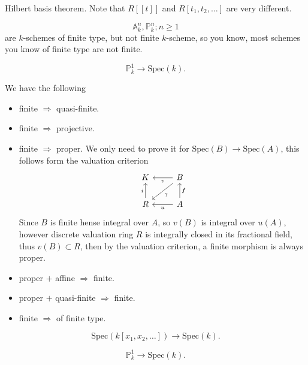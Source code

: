 \documentclass[../main.tex]{subfiles}
\begin{document}
\begin{remark}
Hilbert basis theorem. Note that $R[[t]]$ and $R[t_{1},t_{2},\dots]$ are very different.
\end{remark}
\begin{example}
$$\mathbb{A}_{k}^{n}, \mathbb{P}_{k}^{n}; n\geq 1$$
are $k$-schemes of finite type, but not finite $k$-scheme, so you know, most schemes you know of finite type are not finite.
\end{example}
\begin{remark}
\end{remark}
\begin{example}
$$\mathbb{P}_{k}^{1}\rightarrow \mathrm{Spec}(k).$$
\end{example}
\begin{remark}
We have the following 
\begin{itemize}
\item finite $\Rightarrow$ quasi-finite.
\item finite $\Rightarrow$ projective.
\item finite $\Rightarrow$ proper. We only need to prove it for $\mathrm{Spec}(B)\rightarrow \mathrm{Spec}(A)$, this follows form the valuation criterion
$$\begin{tikzcd}K& B\arrow{l}{v}\arrow{dl}{?}\\
R\arrow{u}{i} & A\arrow{l}{u}\arrow{u}[swap]{f}\end{tikzcd}$$
Since $B$ is finite hense integral over $A$, so $v(B)$ is integral over $u(A)$, however discrete valuation ring $R$ is integrally closed in its fractional field, thus $v(B)\subset R$, then by the valuation criterion, a finite morphism is always proper. 
\item proper $+$ affine $\Rightarrow$ finite.
\item proper $+$ quasi-finite $\Rightarrow$ finite.
\item finite $\Rightarrow$ of finite type.
\end{itemize}
\end{remark}
\begin{example}

\end{example}
\begin{example}
$$\mathrm{Spec}(k[x_{1},x_{2},\dots ])\rightarrow \mathrm{Spec}(k).$$
\end{example}
\begin{example}
$$\mathbb{P}_{k}^{1}\rightarrow \mathrm{Spec}(k).$$
\end{example}
\end{document}
